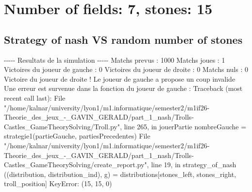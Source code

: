 \documentclass{article}%
\begin{document}
%
\normalsize%
\section{Number of fields: 7, stones: 15}%
\label{sec:Number of fields 7, stones 15}%
\subsection{Strategy of nash VS random number of stones}%
\label{subsec:Strategy of nash VS random number of stones}%
{-}{-}{-}{-}{-} Resultats de la simulation {-}{-}{-}{-}{-}\newline%
		\newline%
Matchs prevus : 1000\newline%
Matchs joues : 1\newline%
\newline%
Victoires du joueur de gauche : 0\newline%
Victoires du joueur de droite : 0\newline%
Matchs nuls : 0\newline%
\newline%
Victoire du joueur de droite ! Le joueur de gauche a propose un coup invalide\newline%
Une erreur est survenue dans la fonction du joueur de gauche : \newline%
Traceback (most recent call last):\newline%
  File "/home/kalnar/university/lyon1/m1.informatique/semester2/m1if26{-}Theorie\_des\_jeux\_{-}\_GAVIN\_GERALD/part\_1\_nash/Trolls{-}Castles\_GameTheorySolving/Troll.py", line 265, in jouerPartie\newline%
    nombreGauche = strategie1(partieGauche, partiesPrecedentes)\newline%
  File "/home/kalnar/university/lyon1/m1.informatique/semester2/m1if26{-}Theorie\_des\_jeux\_{-}\_GAVIN\_GERALD/part\_1\_nash/Trolls{-}Castles\_GameTheorySolving/create\_report.py", line 19, in strategy\_of\_nash\newline%
    ((distribution, distribution\_ind), g) = distributions{[}stones\_left, stones\_right, troll\_position{]}\newline%
KeyError: (15, 15, 0)\newline%

%
\end{document}
